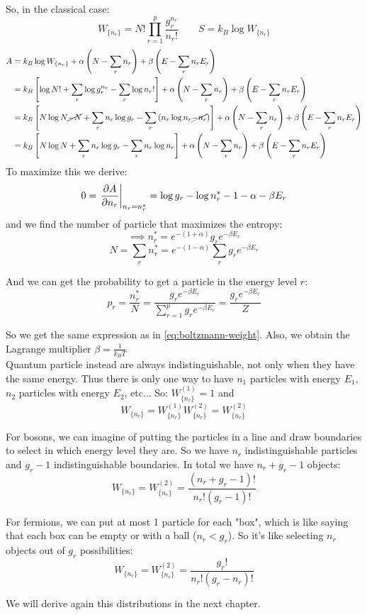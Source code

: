 So, in the classical case: 
$$W_{\{n_r\}} = N! \prod_{r=1}^p \frac{g_r^{n_r}}{n_r!} \qquad S = k_B \log W_{\{n_r\}}$$
\begin{align*}
    A &= k_B \log W_{\{n_r\}} + \alpha \left(N - \sum_r n_r\right) + \beta \left(E - \sum_r n_rE_r\right) \\
    &= k_B \left[\log N! + \sum_r \log g_r^{n_r} - \sum_r \log n_r!\right] + \alpha \left(N - \sum_r n_r\right) + \beta\left(E - \sum_r n_rE_r\right)\\
    &= k_B \left[N\log N \cancel{- N} + \sum_r n_r\log g_r - \sum_r \left(n_r\log n_r \cancel{-n_r}\right)\right] + \alpha \left(N - \sum_r n_r\right) + \beta\left(E - \sum_r n_rE_r\right)\\
    &= k_B \left[N\log N + \sum_r n_r\log g_r - \sum_r n_r\log n_r\right] + \alpha \left(N - \sum_r n_r\right) + \beta\left(E - \sum_r n_rE_r\right)
\end{align*}
To maximize this we derive:
$$ 0 = \left.\frac{\partial A}{\partial n_r}\right|_{n_r = n_r^*} = \log g_r - \log n_r^* - 1 - \alpha - \beta E_r$$
and we find the number of particle that maximizes the entropy:
$$ \implies n_r^* = e^{-(1+\alpha)} g_r e^{-\beta E_r}$$
$$ N = \sum_r n_r^* = e^{-(1-\alpha)} \sum_r g_r e^{-\beta E_r}$$

And we can get the probability to get a particle in the energy level $r$:
$$ p_r = \frac{n_r^*}N = \frac{g_r e^{-\beta E_r}}{\sum_{r=1}^p g_r e^{-\beta E_r}} = \frac{g_r e^{-\beta E_r}}Z $$

So we get the same expression as in \ref{eq:boltzmann-weight}. Also, we obtain the Lagrange multiplier $\beta = \frac 1{k_BT}$\\

Quantum particle instead are always indistinguishable, not only when they have the same energy. Thus there is only one way to have $n_1$ particles with energy $E_1$, $n_2$ particles with energy $E_2$, etc... So: $W_{\{n_r\}}^{(1)} = 1$ and
$$ W_{\{n_r\}} = W^{(1)}_{\{n_r\}} W^{(2)}_{\{n_r\}} = W^{(2)}_{\{n_r\}}$$

For bosons, we can imagine of putting the particles in a line and draw boundaries to select in which energy level they are. So we have $n_r$ indistinguishable particles and $g_r-1$ indistinguishable boundaries. In total we have $n_r + g_r -1$ objects:
$$ W_{\{n_r\}} = W^{(2)}_{\{n_r\}} = \frac{(n_r+ g_r-1)!}{n_r!(g_r-1)!}$$

For fermions, we can put at most 1 particle for each "box", which is like saying that each box can be empty or with a ball ($n_r < g_r$). So it's like selecting $n_r$ objects out of $g_r$ possibilities:
$$W_{\{n_r\}} = W^{(2)}_{\{n_r\}} = \frac{g_r!}{n_r!(g_r-n_r)!}$$

\vspace{20pt}

We will derive again this distributions in the next chapter.
